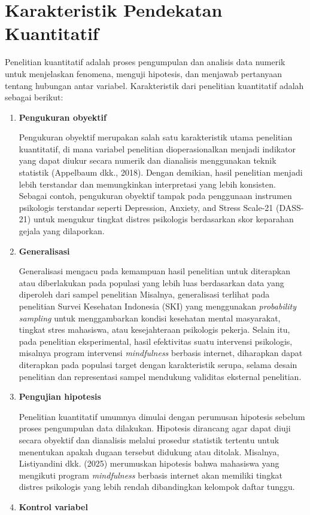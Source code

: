 \documentclass[
  indonesian,
  letterpaper,
  DIV=11,
  numbers=noendperiod]{scrreprt}
\begin{document}
\section{Karakteristik Pendekatan
Kuantitatif}\label{karakteristik-pendekatan-kuantitatif}

Penelitian kuantitatif adalah proses pengumpulan dan analisis data
numerik untuk menjelaskan fenomena, menguji hipotesis, dan menjawab
pertanyaan tentang hubungan antar variabel. Karakteristik dari
penelitian kuantitatif adalah sebagai berikut:

\begin{enumerate}
\def\labelenumi{\arabic{enumi}.}
\item
  \textbf{Pengukuran obyektif}

  Pengukuran obyektif merupakan salah satu karakteristik utama
  penelitian kuantitatif, di mana variabel penelitian dioperasionalkan
  menjadi indikator yang dapat diukur secara numerik dan dianalisis
  menggunakan teknik statistik (Appelbaum dkk., 2018). Dengan demikian,
  hasil penelitian menjadi lebih terstandar dan memungkinkan
  interpretasi yang lebih konsisten. Sebagai contoh, pengukuran obyektif
  tampak pada penggunaan instrumen psikologis terstandar seperti
  Depression, Anxiety, and Stress Scale-21 (DASS-21) untuk mengukur
  tingkat distres psikologis berdasarkan skor keparahan gejala yang
  dilaporkan.~
\item
  \textbf{Generalisasi}

  Generalisasi mengacu pada kemampuan hasil penelitian untuk diterapkan
  atau diberlakukan pada populasi yang lebih luas berdasarkan data yang
  diperoleh dari sampel penelitian Misalnya, generalisasi terlihat pada
  penelitian Survei Kesehatan Indonesia (SKI) yang menggunakan
  \emph{probability sampling} untuk menggambarkan kondisi kesehatan
  mental masyarakat, tingkat stres mahasiswa, atau kesejahteraan
  psikologis pekerja. Selain itu, pada penelitian eksperimental, hasil
  efektivitas suatu intervensi psikologis, misalnya program intervensi
  \emph{mindfulness} berbasis internet, diharapkan dapat diterapkan pada
  populasi target dengan karakteristik serupa, selama desain penelitian
  dan representasi sampel mendukung validitas eksternal penelitian.
\item
  \textbf{Pengujian hipotesis}

  Penelitian kuantitatif umumnya dimulai dengan perumusan hipotesis
  sebelum proses pengumpulan data dilakukan. Hipotesis dirancang agar
  dapat diuji secara obyektif dan dianalisis melalui prosedur statistik
  tertentu untuk menentukan apakah dugaan tersebut didukung atau
  ditolak. Misalnya, Listiyandini dkk. (2025) merumuskan hipotesis bahwa
  mahasiswa yang mengikuti program \emph{mindfulness} berbasis internet
  akan memiliki tingkat distres psikologis yang lebih rendah
  dibandingkan kelompok daftar tunggu.
\item
  \textbf{Kontrol variabel}


\end{enumerate}
\end{document}
